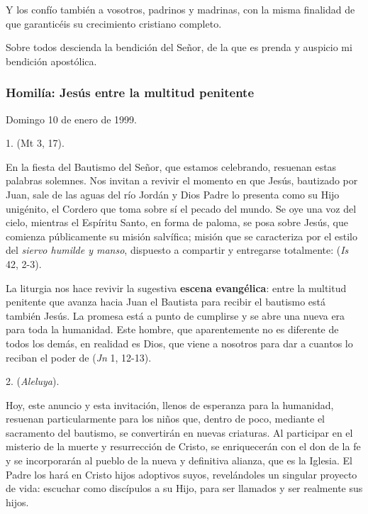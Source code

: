 \begin{body}
\begin{body}
{Y los confío también a vosotros, padrinos y madrinas, con la misma finalidad de que garanticéis su crecimiento cristiano completo.

Sobre todos descienda la bendición del Señor, de la que es prenda y auspicio mi bendición apostólica.

\subsubsection{Homilía: Jesús entre la multitud penitente}

Domingo 10 de enero de 1999.

1.  (Mt 3, 17).

En la fiesta del Bautismo del Señor, que estamos celebrando, resuenan estas palabras solemnes. Nos invitan a revivir el momento en que Jesús, bautizado por Juan, sale de las aguas del río Jordán y Dios Padre lo presenta como su Hijo unigénito, el Cordero que toma sobre sí el pecado del mundo. Se oye una voz del cielo, mientras el Espíritu Santo, en forma de paloma, se posa sobre Jesús, que comienza públicamente su misión salvífica; misión que se caracteriza por el estilo del \emph{siervo humilde y manso}, dispuesto a compartir y entregarse totalmente:  (\emph{Is} 42, 2-3).

La liturgia nos hace revivir la sugestiva \textbf{escena evangélica}: entre la multitud penitente que avanza hacia Juan el Bautista para recibir el bautismo está también Jesús. La promesa está a punto de cumplirse y se abre una nueva era para toda la humanidad. Este hombre, que aparentemente no es diferente de todos los demás, en realidad es Dios, que viene a nosotros para dar a cuantos lo reciban el poder de  (\emph{Jn} 1, 12-13).

2.  (\emph{Aleluya}).

Hoy, este anuncio y esta invitación, llenos de esperanza para la humanidad, resuenan particularmente para los niños que, dentro de poco, mediante el sacramento del bautismo, se convertirán en nuevas criaturas. Al participar en el misterio de la muerte y resurrección de Cristo, se enriquecerán con el don de la fe y se incorporarán al pueblo de la nueva y definitiva alianza, que es la Iglesia. El Padre los hará en Cristo hijos adoptivos suyos, revelándoles un singular proyecto de vida: escuchar como discípulos a su Hijo, para ser llamados y ser realmente sus hijos.

}
\end{body}
\end{body}
